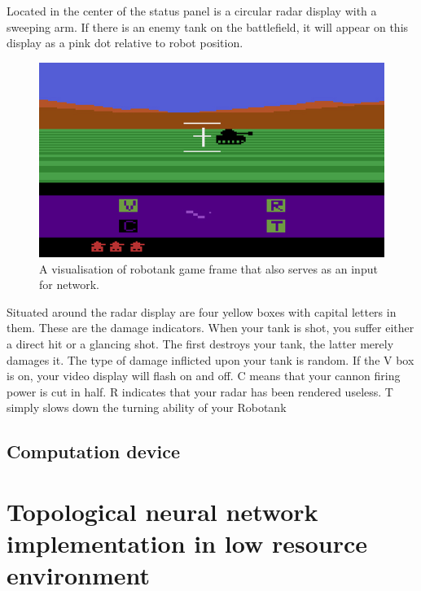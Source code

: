 Located in the center of the status panel is a circular radar display with a sweeping arm.
If there is an enemy tank on the battlefield, it will appear on this display as a pink dot 
relative to robot position.
\begin{figure}[htb] 
	\centering
	\includegraphics[width=\textwidth]{figures/robotank}
	\caption{A visualisation of robotank game frame that also serves as an input for network.}
	\label{fig:robotank}
\end{figure}

Situated around the radar display are four yellow boxes with capital letters in them.
These are the damage indicators. When your tank is shot, you suffer either a direct hit or a 
glancing shot. The first destroys your tank, the latter merely damages it.
The type of damage inflicted upon your tank is random.
If the V box is on, your video display will flash on and off. C means that your cannon 
firing power is cut in half. R indicates that your radar has been rendered useless.
T simply slows down the turning ability of your Robotank

\FloatBarrier
\subsection{Computation device}

\FloatBarrier
\section{Topological neural network implementation in low resource environment}

\FloatBarrier
